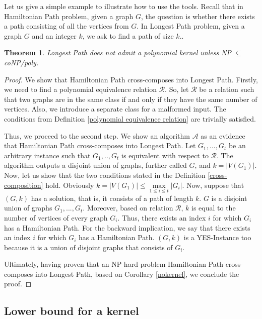 \documentclass[en]{pracamgr}
\newtheorem{theorem}{Theorem}
\begin{document}
Let us give a simple example to illustrate how to use the tools. Recall that in {\sc Hamiltonian Path} problem, given a graph $G$, the question is whether there exists a path consisting of all the vertices from $G$. In {\sc Longest Path} problem, given a graph $G$ and an integer $k$, we ask to find a path of size $k$.. 

\begin{theorem}
	{\sc Longest Path} does not admit a polynomial kernel unless NP $\subseteq$ coNP/poly.
\end{theorem}

\begin{proof}	
	 We show that {\sc Hamiltonian Path} cross-composes into {\sc Longest Path}. Firstly, we need to find a polynomial equivalence relation $\mathcal{R}$. So, let $\mathcal{R}$ be a relation such that two graphs are in the same class if and only if they have the same number of vertices. Also, we introduce a separate class for a malformed input. The conditions from Definition \ref{polynomial equivalence relation} are trivially satisfied. 
	
	Thus, we proceed to the second step. We show an algorithm $\mathcal{A}$ as an evidence that  {\sc Hamiltonian Path} cross-composes into {\sc Longest Path}. Let $G_1,...,G_t$ be an arbitrary instance such that $G_1,..,G_t$ is equivalent with respect to $\mathcal{R}$. The algorithm outputs a disjoint union of graphs, further called $G$, and $k=|V(G_1)|$. Now, let us show that the two conditions stated in the Definition \ref{cross-composition} hold. Obviously $k=|V(G_1)| \leq \max\limits_{1 \leq i \leq t} |G_i|$. Now, suppose that $(G,k)$ has a solution, that is, it consists of a path of length $k$. $G$ is a disjoint union of graphs $G_1,...,G_t$. Moreover, based on relation $\mathcal{R}$, $k$ is equal to the number of vertices of every graph $G_i$. Thus, there exists an index $i$ for which $G_i$ has a Hamiltonian Path. For the backward implication, we say that there exists an index $i$ for which $G_i$ has a Hamiltonian Path. $(G,k)$ is a YES-Instance too because it is a union of disjoint graphs that consists of $G_i$.
	
	Ultimately, having proven that an NP-hard problem {\sc Hamiltonian Path} cross-composes into {\sc Longest Path}, based on Corollary \ref{nokernel}, we conclude the proof.
\end{proof}

\subsection{Lower bound for a kernel}
\end{document}
